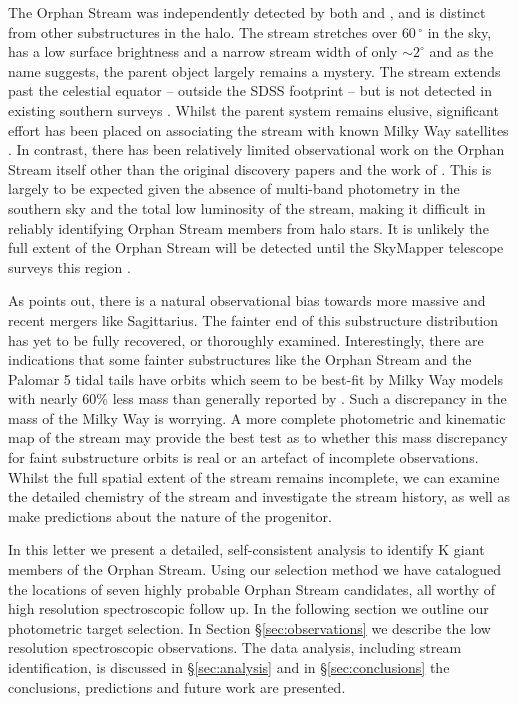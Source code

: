 \documentclass{emulateapj}
\begin{document}
The Orphan Stream was independently detected by both \citet{Grillmair;Dionatos_2006} and \citet{Belokurov;et-al_2006}, and is distinct from other substructures in the halo. The stream stretches over $60\,^\circ$ in the sky, has a low surface brightness and a narrow stream width of only $\sim2^\circ$ and as the name suggests, the parent object largely remains a mystery. The stream extends past the celestial equator \--- outside the SDSS footprint \--- but is not detected in existing southern surveys \citep{Newberg;et-al_2010}. Whilst the parent system remains elusive, significant effort has been placed on associating the stream with known Milky Way satellites \citep{Zucker;et-al_2006, Fellhaur;et-al_2007,Jin;Lynden_Bell_2007,Sales;et-al_2008}. In contrast, there has been relatively limited observational work on the Orphan Stream itself other than the original discovery papers \citep{Grillmair;Dionatos_2006, Belokurov;et-al_2006, Belokurov;et-al_2007} and the work of \citet{Newberg;et-al_2010}. This is largely to be expected given the absence of multi-band photometry in the southern sky and the total low luminosity of the stream, making it difficult in reliably identifying Orphan Stream members from halo stars. It is unlikely the full extent of the Orphan Stream will be detected until the SkyMapper telescope surveys this region \citep{Keller;et-al_2007}. 

As \citet{Sales;et-al_2008} points out, there is a natural observational bias towards more massive and recent mergers like Sagittarius. The fainter end of this substructure distribution has yet to be fully recovered, or thoroughly examined. Interestingly, there are indications that  some fainter substructures like the Orphan Stream \citep{Newberg;et-al_2010} and the Palomar 5 tidal tails \citep{Odenkirchen;et-al_2009} have orbits which seem to be best-fit by Milky Way models with nearly 60\% less mass \citep{Newberg;et-al_2010} than generally reported by \citet{Xue;et-al_2008, Koposov;et-al_2010}. Such a discrepancy in the mass of the Milky Way is worrying. A more complete photometric and kinematic map of the stream may provide the best test as to whether this mass discrepancy for faint substructure orbits is real or an artefact of incomplete observations. Whilst the full spatial extent of the stream remains incomplete, we can examine the detailed chemistry of the stream and investigate the stream history, as well as make predictions about the nature of the progenitor.

In this letter we present a detailed, self-consistent analysis to identify K giant members of the Orphan Stream. Using our selection method we have catalogued the locations of seven highly probable Orphan Stream candidates, all worthy of high resolution spectroscopic follow up. In the following section we outline our photometric target selection. In Section \S\ref{sec:observations} we describe the low resolution spectroscopic observations. The data analysis, including stream identification, is discussed in \S\ref{sec:analysis} and in \S\ref{sec:conclusions} the conclusions, predictions and future work are presented.
\end{document}
